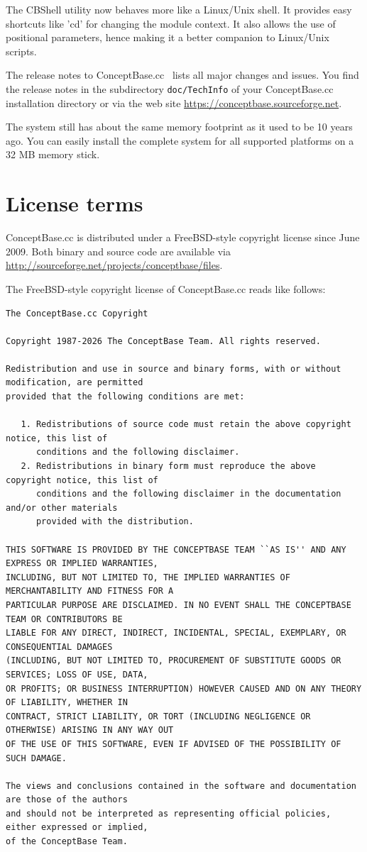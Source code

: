The CBShell utility now behaves more like a Linux/Unix shell. It provides
easy shortcuts like 'cd' for changing the module context. It also
allows the use of positional parameters, hence making it a better
companion to Linux/Unix scripts.

The release notes to ConceptBase.cc \relnr\ lists
all major changes and issues. You find the release notes in the subdirectory
{\tt doc/TechInfo} of your ConceptBase.cc installation directory or via
the web site \url{https://conceptbase.sourceforge.net}.

The  system still has about the same memory footprint as it used to be 10 years ago. You can
easily install the complete system for all supported platforms on a 32 MB memory
stick.

\newpage
\section{License terms}
\label{sec:license}

ConceptBase.cc is distributed under a FreeBSD-style copyright license since June 2009.
Both binary and source code are available via \url{http://sourceforge.net/projects/conceptbase/files}. 

The FreeBSD-style copyright license of ConceptBase.cc reads like follows:

{\scriptsize
\begin{verbatim}
The ConceptBase.cc Copyright

Copyright 1987-2026 The ConceptBase Team. All rights reserved.

Redistribution and use in source and binary forms, with or without modification, are permitted
provided that the following conditions are met:

   1. Redistributions of source code must retain the above copyright notice, this list of
      conditions and the following disclaimer.
   2. Redistributions in binary form must reproduce the above copyright notice, this list of
      conditions and the following disclaimer in the documentation and/or other materials
      provided with the distribution.

THIS SOFTWARE IS PROVIDED BY THE CONCEPTBASE TEAM ``AS IS'' AND ANY EXPRESS OR IMPLIED WARRANTIES,
INCLUDING, BUT NOT LIMITED TO, THE IMPLIED WARRANTIES OF MERCHANTABILITY AND FITNESS FOR A
PARTICULAR PURPOSE ARE DISCLAIMED. IN NO EVENT SHALL THE CONCEPTBASE TEAM OR CONTRIBUTORS BE
LIABLE FOR ANY DIRECT, INDIRECT, INCIDENTAL, SPECIAL, EXEMPLARY, OR CONSEQUENTIAL DAMAGES
(INCLUDING, BUT NOT LIMITED TO, PROCUREMENT OF SUBSTITUTE GOODS OR SERVICES; LOSS OF USE, DATA,
OR PROFITS; OR BUSINESS INTERRUPTION) HOWEVER CAUSED AND ON ANY THEORY OF LIABILITY, WHETHER IN
CONTRACT, STRICT LIABILITY, OR TORT (INCLUDING NEGLIGENCE OR OTHERWISE) ARISING IN ANY WAY OUT
OF THE USE OF THIS SOFTWARE, EVEN IF ADVISED OF THE POSSIBILITY OF SUCH DAMAGE.

The views and conclusions contained in the software and documentation are those of the authors
and should not be interpreted as representing official policies, either expressed or implied,
of the ConceptBase Team.
\end{verbatim}
}

